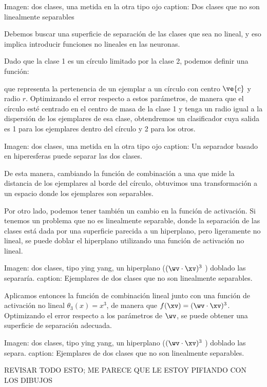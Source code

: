 Imagen: dos clases, una metida en la otra tipo ojo
caption: Dos clases que no son linealmente separables

Debemos buscar una superficie de separación de las clases que sea no lineal, y eso implica introducir funciones no lineales en las neuronas.

Dado que la clase 1 es un círculo limitado por la clase 2, podemos definir una función:

que representa la pertenencia de un ejemplar a un círculo con centro $\ve{c}$ y radio $r$. Optimizando el error respecto a estos parámetros, de manera que el círculo esté centrado en el centro de masa de la clase 1 y tenga un radio igual a la dispersión de los ejemplares de esa clase, obtendremos un clasificador cuya salida es 1 para los ejemplares dentro del círculo y 2 para los otros.  

Imagen: dos clases, una metida en la otra tipo ojo
caption: Un separador basado en hiperesferas puede separar las dos clases.

De esta manera, cambiando la función de combinación a una que mide la distancia de los ejemplares al borde del círculo, obtuvimos una transformación a un espacio donde los ejemplares son separables.

Por otro lado, podemos tener también un cambio en la función de activación. Si tenemos un problema que no es linealmente separable, donde la separación de las clases está dada por una superficie parecida a un hiperplano, pero ligeramente no lineal, se puede doblar el hiperplano utilizando una función de activación no lineal. 

Imagen: dos clases, tipo ying yang, un hiperplano ($(\wv \cdot \xv )^3$ ) doblado las separaría.
caption: Ejemplares de dos clases que no son linealmente separables.

Aplicamos entonces la función de combinación lineal junto con una función de activación no lineal $\theta_3(x)=x^3$, de manera que $f(\xv)=(\wv \cdot \xv )^3$. Optimizando el error respecto a los parámetros de $\wv$, se puede obtener una superficie de separación adecuada.

Imagen: dos clases, tipo ying yang, un hiperplano ($(\wv \cdot \xv )^3$ ) doblado las separa.
caption: Ejemplares de dos clases que no son linealmente separables.

REVISAR TODO ESTO; ME PARECE QUE LE ESTOY PIFIANDO CON LOS DIBUJOS

